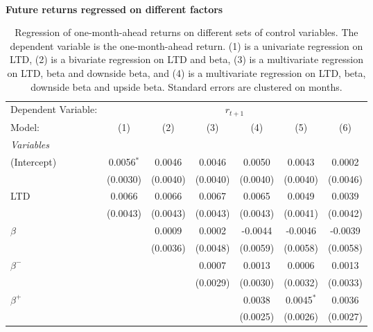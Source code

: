 \begin{table}[H]
\caption{\\ \large{\textbf{Future returns regressed on different factors}}}
\captionsetup{justification = justified, width = \linewidth}
\caption*{Regression of one-month-ahead returns on different
                               sets of control variables. The dependent variable is
                               the one-month-ahead return. (1) is a univariate regression
                               on LTD, (2) is a bivariate regression on LTD and beta,
                               (3) is a multivariate regression on LTD, beta and downside 
                               beta, and (4) is a multivariate regression on LTD, beta,
                               downside beta and upside beta. Standard errors are clustered
                               on months.}
   \centering
\label{reg_clustered_on_time_1}
   \begin{tabular}{lcccccc}
      \tabularnewline \midrule \midrule
      Dependent Variable: & \multicolumn{6}{c}{$r_{t+1}$}\\
      Model:         & (1)          & (2)      & (3)      & (4)      & (5)          & (6)\\  
      \midrule
      \emph{Variables}\\
      (Intercept)    & 0.0056$^{*}$ & 0.0046   & 0.0046   & 0.0050   & 0.0043       & 0.0002\\   
                     & (0.0030)     & (0.0040) & (0.0040) & (0.0040) & (0.0040)     & (0.0046)\\   
      LTD            & 0.0066       & 0.0066   & 0.0067   & 0.0065   & 0.0049       & 0.0039\\   
                     & (0.0043)     & (0.0043) & (0.0043) & (0.0043) & (0.0041)     & (0.0042)\\   
      $\beta$        &              & 0.0009   & 0.0002   & -0.0044  & -0.0046      & -0.0039\\   
                     &              & (0.0036) & (0.0048) & (0.0059) & (0.0058)     & (0.0058)\\   
      $\beta^{-}$    &              &          & 0.0007   & 0.0013   & 0.0006       & 0.0013\\   
                     &              &          & (0.0029) & (0.0030) & (0.0032)     & (0.0033)\\   
      $\beta^{+}$    &              &          &          & 0.0038   & 0.0045$^{*}$ & 0.0036\\   
                     &              &          &          & (0.0025) & (0.0026)     & (0.0027)\\   

\end{tabular}
\end{table}
